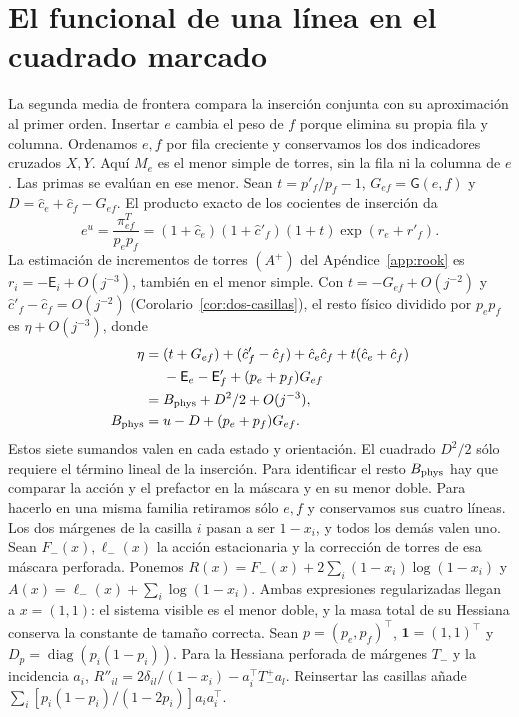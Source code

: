 \section{El funcional de una línea en el cuadrado marcado}\label{app:weights}
La segunda media de frontera compara la inserción conjunta con su aproximación al primer
orden. Insertar \(e\) cambia el peso de \(f\) porque elimina su propia fila y columna.
Ordenamos \(e,f\) por fila creciente y conservamos los dos indicadores cruzados \(X,Y\).
Aquí \(M_e\) es el menor simple de torres, sin la fila ni la columna de \(e\). Las primas
se evalúan en ese menor. Sean \(t=p'_f/p_f-1\), \(G_{ef}=\mathsf G(e,f)\) y
\(D=\hat c_e+\hat c_f-G_{ef}\). El producto exacto de los cocientes de inserción da
\[
 e^{u}=\frac{\pi^T_{ef}}{p_ep_f}
      =(1+\hat c_e)(1+\hat c'_f)(1+t)\exp(r_e+r'_f).
\]
La estimación de incrementos de torres \((A^+)\) del Apéndice~\ref{app:rook} es
\(r_i=-\mathsf E_i+O(j^{-3})\), también en el menor
simple. Con \(t=-G_{ef}+O(j^{-2})\) y \(\hat c'_f-\hat c_f=O(j^{-2})\)
(Corolario~\ref{cor:dos-casillas}), el resto físico dividido
por \(p_ep_f\) es \(\eta+O(j^{-3})\), donde
\begin{align*}
 \eta={}&(t+G_{ef})+(\hat c'_f-\hat c_f)+\hat c_e\hat c_f+t(\hat c_e+\hat c_f)\\
        &-\mathsf E_e-\mathsf E'_f+(p_e+p_f)G_{ef}\\
     ={}&B_{\rm phys}+D^2/2+O(j^{-3}),\\
 B_{\rm phys}={}&u-D+(p_e+p_f)G_{ef}.
\end{align*}
Estos siete sumandos valen en cada estado y orientación. El cuadrado \(D^2/2\) sólo requiere
el término lineal de la inserción. Para identificar el resto \(B_{\rm phys}\) hay que comparar la
acción y el prefactor en la máscara y en su menor doble. Para hacerlo en una misma familia
retiramos sólo \(e,f\) y conservamos sus cuatro líneas. Los dos márgenes de la casilla \(i\)
pasan a ser \(1-x_i\), y todos los demás valen uno. Sean \(F_-(x),\ell_-(x)\) la acción
estacionaria y la corrección de torres de esa máscara perforada. Ponemos
\(R(x)=F_-(x)+2\sum_i(1-x_i)\log(1-x_i)\) y \(A(x)=\ell_-(x)+\sum_i\log(1-x_i)\).
Ambas expresiones regularizadas llegan a \(x=(1,1)\): el sistema visible es el menor doble,
y la masa total de su Hessiana conserva la constante de tamaño correcta.
Sean \(p=(p_e,p_f)^\top\), \(\mathbf1=(1,1)^\top\) y
\(D_p=\operatorname{diag}(p_i(1-p_i))\).
Para la Hessiana perforada de márgenes \(T_-\) y la incidencia \(a_i\),
\(R''_{il}=2\delta_{il}/(1-x_i)-a_i^\top T_-^+a_l\).
Reinsertar las casillas añade \(\sum_i[p_i(1-p_i)/(1-2p_i)]a_i a_i^\top\).
